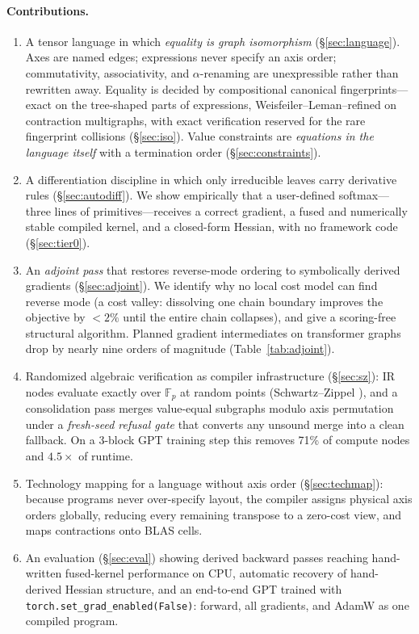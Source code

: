 \documentclass[sigplan,10pt,review]{acmart}
\begin{document}
\paragraph{Contributions.}
\begin{enumerate}
\item A tensor language in which \emph{equality is graph isomorphism}
  (\S\ref{sec:language}). Axes are named edges; expressions never specify
  an axis order; commutativity, associativity, and $\alpha$-renaming are
  unexpressible rather than rewritten away. Equality is decided by
  compositional canonical fingerprints---exact on the tree-shaped parts of
  expressions, Weisfeiler--Leman--refined on contraction multigraphs, with
  exact verification reserved for the rare fingerprint collisions
  (\S\ref{sec:iso}). Value constraints are \emph{equations in the language
  itself} with a termination order (\S\ref{sec:constraints}).
\item A differentiation discipline in which only irreducible leaves carry
  derivative rules (\S\ref{sec:autodiff}). We show empirically that a
  user-defined softmax---three lines of primitives---receives a correct
  gradient, a fused and numerically stable compiled kernel, and a
  closed-form Hessian, with no framework code (\S\ref{sec:tier0}).
\item An \emph{adjoint pass} that restores reverse-mode ordering to
  symbolically derived gradients (\S\ref{sec:adjoint}). We identify why no
  local cost model can find reverse mode (a cost valley: dissolving one
  chain boundary improves the objective by ${<}2\%$ until the entire chain
  collapses), and give a scoring-free structural algorithm. Planned
  gradient intermediates on transformer graphs drop by nearly nine orders
  of magnitude (Table~\ref{tab:adjoint}).
\item Randomized algebraic verification as compiler infrastructure
  (\S\ref{sec:sz}): IR nodes evaluate exactly over $\mathbb{F}_p$ at
  random points (Schwartz--Zippel \cite{schwartz1980,zippel1979,demillo1978}), and a
  consolidation pass merges value-equal subgraphs modulo axis permutation
  under a \emph{fresh-seed refusal gate} that converts any unsound merge
  into a clean fallback. On a 3-block GPT training step this removes 71\%
  of compute nodes and $4.5\times$ of runtime.
\item Technology mapping \cite{dagon} for a language without axis order
  (\S\ref{sec:techmap}): because programs never over-specify layout, the
  compiler assigns physical axis orders globally, reducing every remaining
  transpose to a zero-cost view, and maps contractions onto BLAS cells.
\item An evaluation (\S\ref{sec:eval}) showing derived backward passes
  reaching hand-written fused-kernel performance on CPU, automatic
  recovery of hand-derived Hessian structure, and an end-to-end GPT trained with
  \texttt{torch.set\_grad\_enabled(False)}: forward, all gradients, and
  AdamW as one compiled program.
\end{enumerate}
\end{document}
